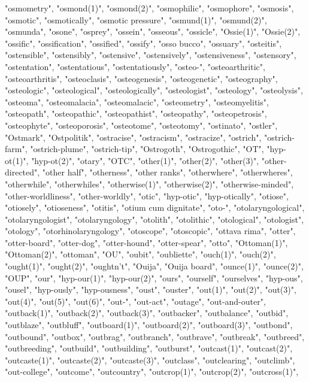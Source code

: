 "osmometry",
"osmond(1)",
"osmond(2)",
"osmophilic",
"osmophore",
"osmosis",
"osmotic",
"osmotically",
"osmotic pressure",
"osmund(1)",
"osmund(2)",
"osmunda",
"osone",
"osprey",
"ossein",
"osseous",
"ossicle",
"Ossie(1)",
"Ossie(2)",
"ossific",
"ossification",
"ossified",
"ossify",
"osso bucco",
"ossuary",
"osteitis",
"ostensible",
"ostensibly",
"ostensive",
"ostensively",
"ostensiveness",
"ostensory",
"ostentation",
"ostentatious",
"ostentatiously",
"osteo-",
"osteoarthritic",
"osteoarthritis",
"osteoclasis",
"osteogenesis",
"osteogenetic",
"osteography",
"osteologic",
"osteological",
"osteologically",
"osteologist",
"osteology",
"osteolysis",
"osteoma",
"osteomalacia",
"osteomalacic",
"osteometry",
"osteomyelitis",
"osteopath",
"osteopathic",
"osteopathist",
"osteopathy",
"osteopetrosis",
"osteophyte",
"osteoporosis",
"osteotome",
"osteotomy",
"ostinato",
"ostler",
"Ostmark",
"Ostpolitik",
"ostracise",
"ostracism",
"ostracize",
"ostrich",
"ostrich-farm",
"ostrich-plume",
"ostrich-tip",
"Ostrogoth",
"Ostrogothic",
"OT",
"hyp-ot(1)",
"hyp-ot(2)",
"otary",
"OTC",
"other(1)",
"other(2)",
"other(3)",
"other-directed",
"other half",
"otherness",
"other ranks",
"otherwhere",
"otherwheres",
"otherwhile",
"otherwhiles",
"otherwise(1)",
"otherwise(2)",
"otherwise-minded",
"other-worldliness",
"other-worldly",
"otic",
"hyp-otic",
"hyp-otically",
"otiose",
"otiosely",
"otioseness",
"otitis",
"otium cum dignitate",
"oto-",
"otolaryngological",
"otolaryngologist",
"otolaryngology",
"otolith",
"otolithic",
"otological",
"otologist",
"otology",
"otorhinolaryngology",
"otoscope",
"otoscopic",
"ottava rima",
"otter",
"otter-board",
"otter-dog",
"otter-hound",
"otter-spear",
"otto",
"Ottoman(1)",
"Ottoman(2)",
"ottoman",
"OU",
"oubit",
"oubliette",
"ouch(1)",
"ouch(2)",
"ought(1)",
"ought(2)",
"oughtn't",
"Ouija",
"Ouija board",
"ounce(1)",
"ounce(2)",
"OUP",
"our",
"hyp-our(1)",
"hyp-our(2)",
"ours",
"ourself",
"ourselves",
"hyp-ous",
"ousel",
"hyp-ously",
"hyp-ousness",
"oust",
"ouster",
"out(1)",
"out(2)",
"out(3)",
"out(4)",
"out(5)",
"out(6)",
"out-",
"out-act",
"outage",
"out-and-outer",
"outback(1)",
"outback(2)",
"outback(3)",
"outbacker",
"outbalance",
"outbid",
"outblaze",
"outbluff",
"outboard(1)",
"outboard(2)",
"outboard(3)",
"outbond",
"outbound",
"outbox",
"outbrag",
"outbranch",
"outbrave",
"outbreak",
"outbreed",
"outbreeding",
"outbuild",
"outbuilding",
"outburst",
"outcast(1)",
"outcast(2)",
"outcaste(1)",
"outcaste(2)",
"outcaste(3)",
"outclass",
"outclearing",
"outclimb",
"out-college",
"outcome",
"outcountry",
"outcrop(1)",
"outcrop(2)",
"outcross(1)",
